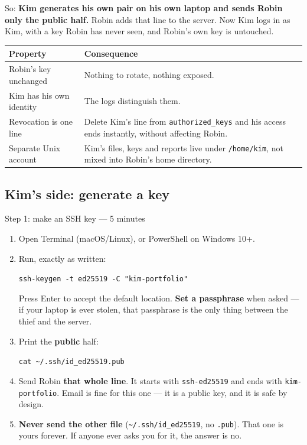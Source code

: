 \documentclass[11pt,a4paper]{article}
\begin{document}
So: \textbf{Kim generates his own pair on his own laptop and sends Robin
only the public half.} Robin adds that line to the server. Now Kim logs
in as Kim, with a key Robin has never seen, and Robin's own key is
untouched.

\vspace{0.5em}
\begin{tabular}{@{}p{3.4cm}p{10.6cm}@{}}
    \toprule
    \textbf{Property} & \textbf{Consequence} \\
    \midrule
    Robin's key unchanged & Nothing to rotate, nothing exposed. \\
    Kim has his own identity & The logs distinguish them. \\
    Revocation is one line & Delete Kim's line from
    \texttt{authorized\_keys} and his access ends instantly, without
    affecting Robin. \\
    Separate Unix account & Kim's files, keys and reports live under
    \texttt{/home/kim}, not mixed into Robin's home directory. \\
    \bottomrule
\end{tabular}

\subsection{Kim's side: generate a key}

\begin{kimbox}{Step 1: make an SSH key --- 5 minutes}
\begin{enumerate}[leftmargin=1.6em, itemsep=3pt]
    \item Open Terminal (macOS/Linux), or PowerShell on Windows 10+.
    \item Run, exactly as written:

    \vspace{0.3em}
    \texttt{ssh-keygen -t ed25519 -C "kim-portfolio"}

    \vspace{0.3em}
    Press Enter to accept the default location. \textbf{Set a
    passphrase} when asked --- if your laptop is ever stolen, that
    passphrase is the only thing between the thief and the server.

    \item Print the \textbf{public} half:

    \vspace{0.3em}
    \texttt{cat \textasciitilde/.ssh/id\_ed25519.pub}

    \vspace{0.3em}
    \item Send Robin \textbf{that whole line}. It starts with
          \texttt{ssh-ed25519} and ends with \texttt{kim-portfolio}.
          Email is fine for this one --- it is a public key, and it is
          safe by design.

    \item \textbf{Never send the other file}
          (\texttt{\textasciitilde/.ssh/id\_ed25519}, no
          \texttt{.pub}). That one is yours forever. If anyone ever
          asks you for it, the answer is no.
\end{enumerate}
\end{kimbox}
\end{document}
